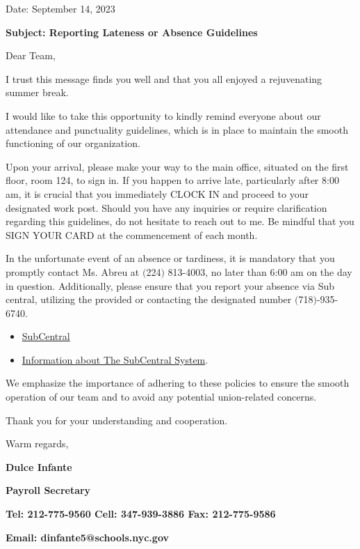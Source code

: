 \documentclass[12pt,letterpaper]{article}
\begin{document}
\vspace*{0.5in}
Date: September 14, 2023 

\textbf{Subject: Reporting Lateness or Absence Guidelines}

Dear Team,

I trust this message finds you well and that you all enjoyed a rejuvenating summer break.

I would like to take this opportunity to kindly remind everyone about our attendance and punctuality guidelines, which is in place to maintain the smooth functioning of our organization.

Upon your arrival, please make your way to the main office, situated on the first floor, room 124, to sign in. If you happen to arrive late, particularly after 8:00 am, it is crucial that you immediately CLOCK IN and proceed to your designated work post. Should you have any inquiries or require clarification 
regarding this guidelines, do not hesitate to reach out to me. 
\pagebreak
\vspace*{0.5in}
Be mindful that you SIGN YOUR CARD at the commencement of each month.

In the unfortunate event of an absence or tardiness, it is mandatory that you promptly contact Ms. Abreu at $($224$)$ 813-4003, no later than 6:00 am on the day in question. Additionally, please ensure that you report your absence via Sub central, utilizing the provided or contacting the designated number $($718$)$-935-6740. 
\begin{itemize}
\item \href{https://subcentral.eschoolsolutions.com/logOnInitAction.do}{SubCentral}
\item \href {https://video.eschoolsolutions.com/udocs/NYCEmployeesWEBCAST2.0.pdf}{
Information about The SubCentral System}.
\end{itemize}
We emphasize the importance of adhering to these policies to ensure the smooth operation of our team and to avoid any potential union-related concerns.

Thank you for your understanding and cooperation.

Warm regards,

\begin{small}
\textbf{Dulce Infante}

\textbf{Payroll Secretary}

\textbf{Tel: 212-775-9560 Cell: 347-939-3886 Fax: 212-775-9586}

\textbf{Email: dinfante5@schools.nyc.gov}
\end{small}
\end{document}
